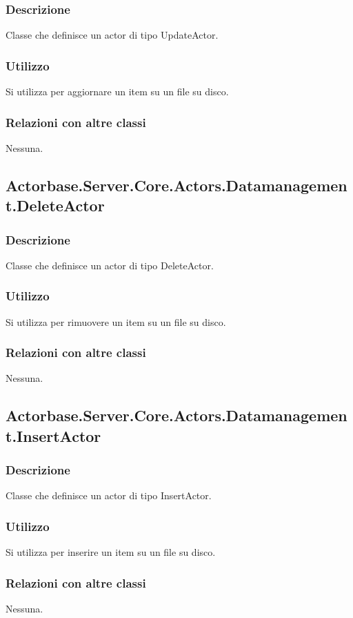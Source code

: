 \documentclass[a4paper]{article}
\begin{document}
			\subsubsection{Descrizione}
				Classe che definisce un actor di tipo UpdateActor.
			\subsubsection{Utilizzo}
				Si utilizza per aggiornare un item su un file su disco.
			\subsubsection{Relazioni con altre classi}
				Nessuna.
			
		\subsection{Actorbase.Server.Core.Actors.Datamanagement.DeleteActor}
			\subsubsection{Descrizione}
				Classe che definisce un actor di tipo DeleteActor.
			\subsubsection{Utilizzo}
				Si utilizza per rimuovere un item su un file su disco. 
			\subsubsection{Relazioni con altre classi}
				Nessuna.
			
		\subsection{Actorbase.Server.Core.Actors.Datamanagement.InsertActor}
			\subsubsection{Descrizione}
				Classe che definisce un actor di tipo InsertActor.
			\subsubsection{Utilizzo}
				Si utilizza per inserire un item su un file su disco. 
			\subsubsection{Relazioni con altre classi}
				Nessuna.
\end{document}
